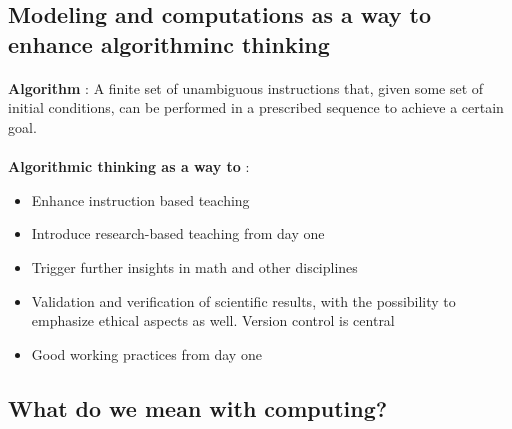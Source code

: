 \documentclass[%
twoside,                 %
final,                   %
10pt]{article}
\begin{document}
\noindent



\subsection*{Modeling and computations as a way to enhance algorithminc thinking}

\paragraph{}
\textbf{Algorithm} : A finite set of unambiguous instructions that, given some set of initial conditions, can be performed in a prescribed sequence to achieve a certain goal.




\paragraph{}
\textbf{Algorithmic  thinking as a way to} :
\begin{itemize}
\item Enhance instruction based teaching

\item Introduce research-based teaching  from day one

\item Trigger further insights in math and other disciplines 

\item Validation and verification of scientific results, with the possibility to emphasize ethical aspects as well. Version control is central

\item Good working practices from day one
\end{itemize}

\noindent





\subsection*{What do we mean with computing?}

\paragraph{}
\end{document}
